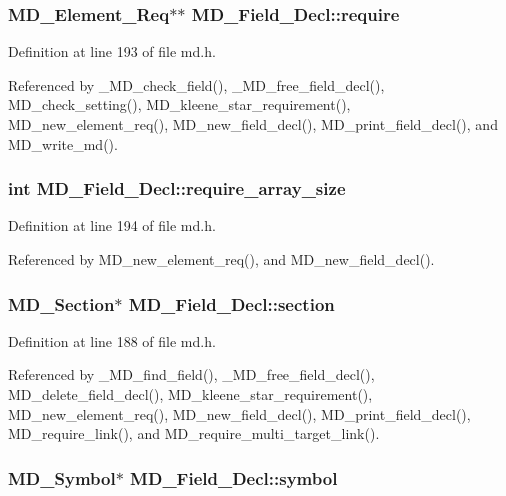 \subsubsection{\setlength{\rightskip}{0pt plus 5cm}\bf{MD\_\-Element\_\-Req}$\ast$$\ast$ \bf{MD\_\-Field\_\-Decl::require}}\label{structMD__Field__Decl_af038c00fca9826f787384ffb4b2eb51}




Definition at line 193 of file md.h.

Referenced by \_\-MD\_\-check\_\-field(), \_\-MD\_\-free\_\-field\_\-decl(), MD\_\-check\_\-setting(), MD\_\-kleene\_\-star\_\-requirement(), MD\_\-new\_\-element\_\-req(), MD\_\-new\_\-field\_\-decl(), MD\_\-print\_\-field\_\-decl(), and MD\_\-write\_\-md().
\subsubsection{\setlength{\rightskip}{0pt plus 5cm}int \bf{MD\_\-Field\_\-Decl::require\_\-array\_\-size}}\label{structMD__Field__Decl_fb21ce63bdbd743020583183120feec6}




Definition at line 194 of file md.h.

Referenced by MD\_\-new\_\-element\_\-req(), and MD\_\-new\_\-field\_\-decl().
\subsubsection{\setlength{\rightskip}{0pt plus 5cm}\bf{MD\_\-Section}$\ast$ \bf{MD\_\-Field\_\-Decl::section}}\label{structMD__Field__Decl_873f013f5dda7d8c245dabc43ac88b4f}




Definition at line 188 of file md.h.

Referenced by \_\-MD\_\-find\_\-field(), \_\-MD\_\-free\_\-field\_\-decl(), MD\_\-delete\_\-field\_\-decl(), MD\_\-kleene\_\-star\_\-requirement(), MD\_\-new\_\-element\_\-req(), MD\_\-new\_\-field\_\-decl(), MD\_\-print\_\-field\_\-decl(), MD\_\-require\_\-link(), and MD\_\-require\_\-multi\_\-target\_\-link().
\subsubsection{\setlength{\rightskip}{0pt plus 5cm}\bf{MD\_\-Symbol}$\ast$ \bf{MD\_\-Field\_\-Decl::symbol}}\label{structMD__Field__Decl_9737850bb71be2c844fe36eb80a0be23}




